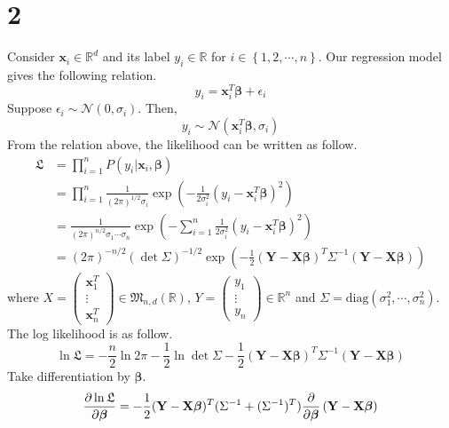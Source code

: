\documentclass[10pt]{article}
\begin{document}
\section*{2}
Consider $\mathbf{x}_i \in \mathbb{R}^d$ and its label $y_i \in \mathbb{R}$ for $i \in \left\{1,2,\cdots, n\right\}$. Our regression model gives the following relation.
\begin{equation}
    y_i = \mathbf{x}_i^T\boldsymbol{\beta} + \epsilon_i
\end{equation}
Suppose $\epsilon_i \sim \mathcal{N}(0,\sigma_i)$. Then, 
\begin{equation}
    y_i \sim \mathcal{N}(\mathbf{x}_i^T\boldsymbol{\beta}, \sigma_i)
\end{equation}
From the relation above, the likelihood can be written as follow.
\begin{align}
    \mathfrak{L} &= \prod_{i=1}^n P(y_i|\mathbf{x}_i,\boldsymbol{\beta})\\ 
     &= \prod_{i=1}^n \frac{1}{(2\pi)^{1/2}\sigma_i}\exp\left(-\frac{1}{2\sigma_i^2}(y_i - \mathbf{x}_i^T\boldsymbol{\beta})^2\right)\\ 
     &= \frac{1}{(2\pi)^{n/2}\sigma_1\cdots \sigma_n}\exp\left(-\sum_{i=1}^{n}\frac{1}{2\sigma_i^2}(y_i - \mathbf{x}_i^T\boldsymbol{\beta})^2\right)\\
     &= (2\pi)^{-n/2}(\det{\Sigma})^{-1/2}\exp\left(-\frac{1}{2}(\mathbf{Y - X}\boldsymbol{\beta})^T \Sigma^{-1} (\mathbf{Y - X}\boldsymbol{\beta})\right)
\end{align}
where $X = \begin{pmatrix}
    \mathbf{x}_1^T \\ \vdots \\ \mathbf{x}_n^T 
\end{pmatrix} \in \mathfrak{M}_{n,d}(\mathbb{R})$, $Y = \begin{pmatrix}
    y_1 \\ \vdots \\ y_n
\end{pmatrix} \in \mathbb{R}^n$ and $\Sigma = \text{diag}(\sigma_1^2, \cdots, \sigma_n^2)$.
The log likelihood is as follow.
\begin{equation}
    \ln \mathfrak{L} = -\frac{n}{2}\ln2\pi - \frac{1}{2}\ln\det\Sigma-\frac{1}{2}(\mathbf{Y - X}\boldsymbol{\beta})^T \Sigma^{-1} (\mathbf{Y - X}\boldsymbol{\beta})
\end{equation}
Take differentiation by $\boldsymbol{\beta}$.
\begin{equation}
    {\partial \ln \mathfrak{L}\over \partial \boldsymbol{\beta}} = -\frac{1}{2}(\mathbf{Y - X}\boldsymbol{\beta})^T(\Sigma^{-1} + (\Sigma^{-1})^T) {\partial \over \partial \boldsymbol{\beta}}\left(\mathbf{Y - X}\boldsymbol{\beta}\right)
\end{equation}
\end{document}
